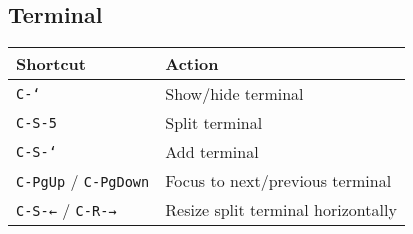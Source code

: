\documentclass[10pt,landscape]{article}
\newcommand{\key}[1]{\textcolor{keycolor}{\texttt{#1}}}
\begin{document}
\begin{multicols}{2}
\section*{\textcolor{sectioncolor}{Terminal}}

\begin{tabular}{@{}p{3cm}p{6.5cm}@{}}
\toprule
\textbf{Shortcut} & \textbf{Action} \\
\midrule
\key{C-`} & Show/hide terminal \\
\key{C-S-5} & Split terminal \\
\key{C-S-`} & Add terminal \\
\key{C-PgUp} / \key{C-PgDown} & Focus to next/previous terminal \\
\key{C-S-←} / \key{C-R-→} & Resize split terminal horizontally\\
\bottomrule
\end{tabular}

\end{multicols}
\end{document}
